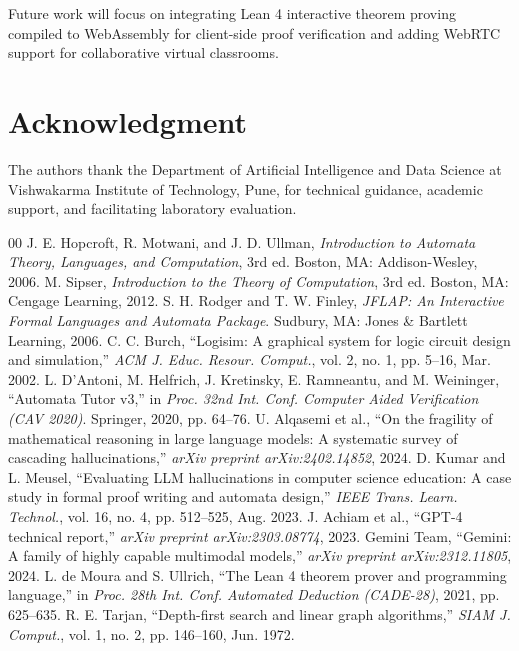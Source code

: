 \documentclass[conference]{IEEEtran}
\begin{document}
Future work will focus on integrating Lean 4 interactive theorem proving~\cite{demoura2021} compiled to WebAssembly for client-side proof verification and adding WebRTC support for collaborative virtual classrooms.

\section*{Acknowledgment}
The authors thank the Department of Artificial Intelligence and Data Science at Vishwakarma Institute of Technology, Pune, for technical guidance, academic support, and facilitating laboratory evaluation.

\begin{thebibliography}{00}
 J. E. Hopcroft, R. Motwani, and J. D. Ullman, \textit{Introduction to Automata Theory, Languages, and Computation}, 3rd ed. Boston, MA: Addison-Wesley, 2006.
 M. Sipser, \textit{Introduction to the Theory of Computation}, 3rd ed. Boston, MA: Cengage Learning, 2012.
 S. H. Rodger and T. W. Finley, \textit{JFLAP: An Interactive Formal Languages and Automata Package}. Sudbury, MA: Jones \& Bartlett Learning, 2006.
 C. C. Burch, ``Logisim: A graphical system for logic circuit design and simulation,'' \textit{ACM J. Educ. Resour. Comput.}, vol. 2, no. 1, pp. 5--16, Mar. 2002.
 L. D'Antoni, M. Helfrich, J. Kretinsky, E. Ramneantu, and M. Weininger, ``Automata Tutor v3,'' in \textit{Proc. 32nd Int. Conf. Computer Aided Verification (CAV 2020)}. Springer, 2020, pp. 64--76.
 U. Alqasemi et al., ``On the fragility of mathematical reasoning in large language models: A systematic survey of cascading hallucinations,'' \textit{arXiv preprint arXiv:2402.14852}, 2024.
 D. Kumar and L. Meusel, ``Evaluating LLM hallucinations in computer science education: A case study in formal proof writing and automata design,'' \textit{IEEE Trans. Learn. Technol.}, vol. 16, no. 4, pp. 512--525, Aug. 2023.
 J. Achiam et al., ``GPT-4 technical report,'' \textit{arXiv preprint arXiv:2303.08774}, 2023.
 Gemini Team, ``Gemini: A family of highly capable multimodal models,'' \textit{arXiv preprint arXiv:2312.11805}, 2024.
 L. de Moura and S. Ullrich, ``The Lean 4 theorem prover and programming language,'' in \textit{Proc. 28th Int. Conf. Automated Deduction (CADE-28)}, 2021, pp. 625--635.
 R. E. Tarjan, ``Depth-first search and linear graph algorithms,'' \textit{SIAM J. Comput.}, vol. 1, no. 2, pp. 146--160, Jun. 1972.

\end{thebibliography}
\end{document}
